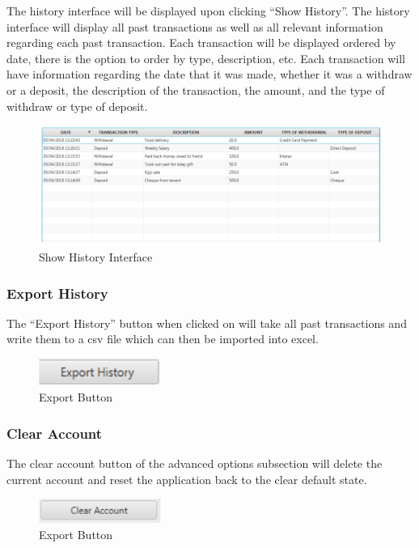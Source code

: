 \documentclass[12pt]{article}
\begin{document}
The history interface will be displayed upon clicking “Show History”. The history interface will display all past transactions as well as all relevant information regarding each past transaction. Each transaction will be displayed ordered by date, there is the option to order by type, description, etc. Each transaction will have information regarding the date that it was made, whether it was a withdraw or a deposit, the description of the transaction, the amount, and the type of withdraw or type of deposit.

\begin{figure}[h!]
  \centering
  \includegraphics[width=180mm]{showhistoryinterface.PNG}
  \caption{Show History Interface}
\end{figure}

\subsubsection{Export History}
The “Export History” button when clicked on will take all past transactions and write them to a csv file which can then be imported into excel.

\begin{figure}[h!]
  \centering
  \includegraphics[width=40mm]{exportbutton.PNG}
  \caption{Export Button}
\end{figure}

\subsubsection{Clear Account}
The clear account button of the advanced options subsection will delete the current account and reset the application back to the clear default state.

\begin{figure}[h!]
  \centering
  \includegraphics[width=40mm]{clearaccount.PNG}
  \caption{Export Button}
\end{figure}
\end{document}
